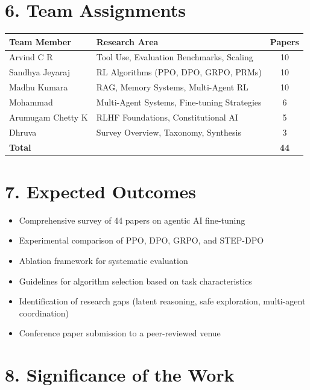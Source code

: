 \documentclass[12pt,a4paper]{report}
\theoremstyle{definition}
\begin{document}
\section*{6. Team Assignments}

\begin{table}[h]
\centering
\begin{tabular}{@{}llc@{}}
\toprule
\textbf{Team Member} & \textbf{Research Area} & \textbf{Papers} \\
\midrule
Arvind C R & Tool Use, Evaluation Benchmarks, Scaling & 10 \\
Sandhya Jeyaraj & RL Algorithms (PPO, DPO, GRPO, PRMs) & 10 \\
Madhu Kumara & RAG, Memory Systems, Multi-Agent RL & 10 \\
Mohammad & Multi-Agent Systems, Fine-tuning Strategies & 6 \\
Arumugam Chetty K & RLHF Foundations, Constitutional AI & 5 \\
Dhruva & Survey Overview, Taxonomy, Synthesis & 3 \\
\midrule
\textbf{Total} & & \textbf{44} \\
\bottomrule
\end{tabular}
\end{table}

\section*{7. Expected Outcomes}

\begin{itemize}
    \item Comprehensive survey of 44 papers on agentic AI fine-tuning
    \item Experimental comparison of PPO, DPO, GRPO, and STEP-DPO
    \item Ablation framework for systematic evaluation
    \item Guidelines for algorithm selection based on task characteristics
    \item Identification of research gaps (latent reasoning, safe exploration, multi-agent coordination)
    \item Conference paper submission to a peer-reviewed venue
\end{itemize}

\section*{8. Significance of the Work}
\end{document}
